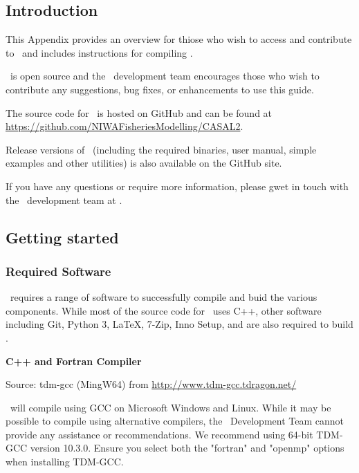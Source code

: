 
\subsection{Introduction\label{AppendixA:Introduction}}

This Appendix provides an overview for thiose who wish to access and contribute to \CNAME\ and includes instructions for compiling \CNAME. 

\CNAME\ is open source and the \CNAME\ development team encourages those who wish to contribute any suggestions, bug fixes, or enhancements to use this guide. 

The source code for \CNAME\ is hosted on GitHub and can be found at \url{https://github.com/NIWAFisheriesModelling/CASAL2}.

Release versions of \CNAME\ (including the required binaries, user manual, simple examples and other utilities) is also available on the GitHub site.

If you have any questions or require more information, please gwet in touch with the \CNAME\ development team at \email.

\subsection{Getting started\label{AppendixA:GettingStarted}}

\subsubsection{Required Software}

\CNAME\ requires a range of software to successfully compile and buid the various components. While most of the source code for \CNAME\ uses C++, other software including Git, Python 3, LaTeX, 7-Zip, Inno Setup, and \R are also required to build \CNAME.

\textbf{C++ and Fortran Compiler}

Source: tdm-gcc (MingW64) from \url{http://www.tdm-gcc.tdragon.net/}

\CNAME\ will compile using GCC on Microsoft Windows and Linux. While it may be possible to compile using alternative compilers, the \CNAME\ Development Team cannot provide any assistance or recommendations. We recommend using 64-bit TDM-GCC version 10.3.0. Ensure you select both the "fortran" and "openmp" options when installing TDM-GCC. 

